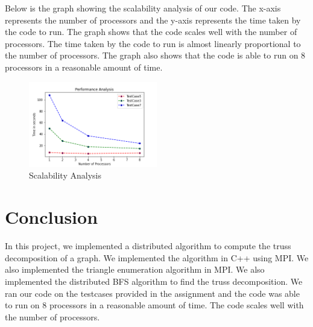 \documentclass{article}
\begin{document}
Below is the graph showing the scalability analysis of our code. The x-axis represents the number of processors and the y-axis represents the time taken by the code to run. The graph shows that the code scales well with the number of processors. The time taken by the code to run is almost linearly proportional to the number of processors. The graph also shows that the code is able to run on 8 processors in a reasonable amount of time. \\

\begin{figure}[h]
    \centering
    \includegraphics[width=0.5\textwidth]{ass2_1.png}
    \caption{Scalability Analysis}
    \label{fig:scalability}
\end{figure}

\section{Conclusion}
In this project, we implemented a distributed algorithm to compute the truss decomposition of a graph. We implemented the algorithm in C++ using MPI. We also implemented the triangle enumeration algorithm in MPI. We also implemented the distributed BFS algorithm to find the truss decomposition. We ran our code on the testcases provided in the assignment and the code was able to run on 8 processors in a reasonable amount of time. The code scales well with the number of processors. 
\end{document}
